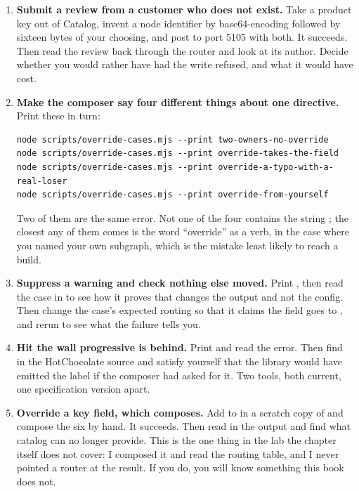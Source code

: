 \begin{enumerate}
  \item \textbf{Submit a review from a customer who does not exist.} Take a
  product key out of Catalog, invent a  node identifier by
  base64-encoding  followed by sixteen bytes of your choosing,
  and post  to port 5105 with both. It succeeds. Then read
  the review back through the router and look at its author. Decide whether you
  would rather have had the write refused, and what it would have cost.

  \item \textbf{Make the composer say four different things about one
  directive.} Print these in turn:

  \begin{verbatim}
node scripts/override-cases.mjs --print two-owners-no-override
node scripts/override-cases.mjs --print override-takes-the-field
node scripts/override-cases.mjs --print override-a-typo-with-a-real-loser
node scripts/override-cases.mjs --print override-from-yourself
  \end{verbatim}

  Two of them are the same error. Not one of the four contains the string
  ; the closest any of them comes is the word \enquote{override}
  as a verb, in the case where you named your own subgraph, which is the mistake
  least likely to reach a build.

  \item \textbf{Suppress a warning and check nothing else moved.} Print
  , then read the case in
   to see how it proves that
   changes the output and not the config. Then change
  the case's expected routing so that it claims the field goes to
  , and rerun to see what the failure tells you.

  \item \textbf{Hit the wall progressive  is behind.} Print
   and read the error. Then find
   in the HotChocolate source and satisfy
  yourself that the library would have emitted the label if the composer had
  asked for it. Two tools, both current, one specification version apart.

  \item \textbf{Override a key field, which composes.} Add
   to  in a scratch copy of
   and compose the six by hand. It succeeds. Then
  read  in the output and find what
  catalog can no longer provide. This is the one thing in the lab the chapter
  itself does not cover: I composed it and read the routing table, and I never
  pointed a router at the result. If you do, you will know something this book
  does not.
\end{enumerate}

